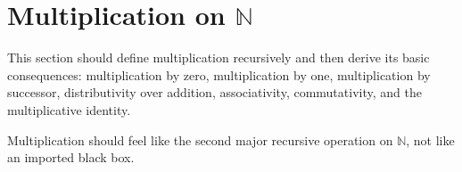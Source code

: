 \section{Multiplication on \texorpdfstring{$\mathbb{N}$}{N}}

This section should define multiplication recursively and then derive its
basic consequences: multiplication by zero, multiplication by one,
multiplication by successor, distributivity over addition, associativity,
commutativity, and the multiplicative identity.

\begin{remark}
Multiplication should feel like the second major recursive operation on
$\mathbb{N}$, not like an imported black box.
\end{remark}
